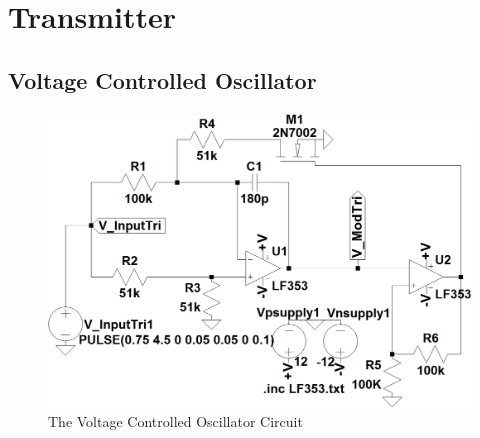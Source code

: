 \documentclass[paper]{IEEEtran}
\begin{document}
\section{Transmitter}

\subsection{Voltage Controlled Oscillator}
\begin{figure}[h!]
 \setlength{\unitlength}{\textwidth}
 \center 
 \includegraphics[width=0.45\unitlength]{VCO_Circuit_FinalModified}
 \caption{\label{fig:VCO_Circuit}The Voltage Controlled Oscillator Circuit}
\end{figure}
\end{document}
